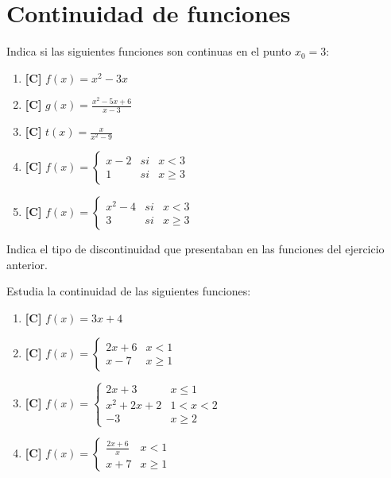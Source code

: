 \section{Continuidad de funciones}

\Exercicio Indica si las siguientes funciones son continuas en el punto $ x_0 = 3 $:
\begin{enumerate}[topsep=0pt]
\item \textbf{[C]} $f(x) = x^2-3x$
	\item \textbf{[C]} $g(x) = \frac{x^2-5x+6}{x-3} $
	\item \textbf{[C]} $t(x) = \frac{x}{x^2-9}$
	\item \textbf{[C]} $f(x) = \left\{ \begin{array}{lcc}
						x - 2 &   si  & x < 3 \\
						1 &  si & x \ge 3
						\end{array}
						\right.$
	\item \textbf{[C]} $f(x) = \left\{ \begin{array}{lcc}
						x^2 - 4 &   si  & x < 3 \\
						3 &  si & x \ge 3
						\end{array}
						\right.$
\end{enumerate}


\Exercicio Indica el tipo de discontinuidad que presentaban en las funciones del ejercicio anterior.

\Exercicio Estudia la continuidad de las siguientes funciones:
\begin{enumerate}[topsep=0pt]
	\item \textbf{[C]} $f(x) = 3x + 4$
	\item \textbf{[C]} $f(x) = \left\{ \begin{array}{ll}
						2x+6      &  x < 1 \\
						x-7       &  x \ge 1
						\end{array}
						\right.$
	\item \textbf{[C]} $ f(x) = \left\{ \begin{array}{ll}
			             2x+3           &    x \le 1 \\
			             x^2+2x+2       &    1 < x < 2 \\
						 -3             &    x \ge 2
			             \end{array}
			   			\right.$
	\item \textbf{[C]} $ f(x) = \left\{ \begin{array}{ll}
						 \frac{2x+6}{x}      &    x < 1 \\
						 x+7                 &  x \ge 1
						 \end{array}
						 \right.$
\end{enumerate}



